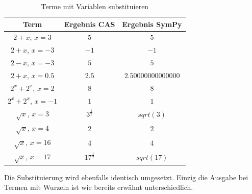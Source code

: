 \documentclass[11pt,a4paper, ngerman]{article}
\begin{document}
\begin{table}[ht!]
    \caption{Terme mit Variablen substituieren}
    \centering
    \begin{tabular}{|c|c|c|}
        \hline
        \textbf{Term} & \textbf{Ergebnis CAS} & \textbf{Ergebnis SymPy} \\
        \hline
        $2+x$, $x=3$ & $5$ & $5$ \\
        \hline
        $2+x$, $x=-3$ & $-1$ & $-1$ \\
        \hline
        $2-x$, $x=-3$ & $5$ & $5$ \\
        \hline
        $2+x$, $x=0.5$ & $2.5$ & $2.50000000000000$ \\
        \hline
        $2^{x} + 2^{x}$, $x=2$ & $8$ & $8$ \\
        \hline
        $2^{x} + 2^{x}$, $x=-1$ & $1$ & $1$ \\
        \hline
        $\sqrt{x}$, $x=3$ & $3^{\frac{1}{2}}$ & $sqrt(3)$ \\
        \hline
        $\sqrt{x}$, $x=4$ & $2$ & $2$ \\
        \hline
        $\sqrt{x}$, $x=16$ & $4$ & $4$ \\
        \hline
        $\sqrt{x}$, $x=17$ & $17^{\frac{1}{2}}$ & $sqrt(17)$ \\
        \hline
    \end{tabular}
\end{table}

Die Substituierung wird ebenfalls identisch umgesetzt. Einzig die Ausgabe bei Termen mit Wurzeln ist wie bereits erwähnt unterschiedlich.

\newpage
\end{document}
